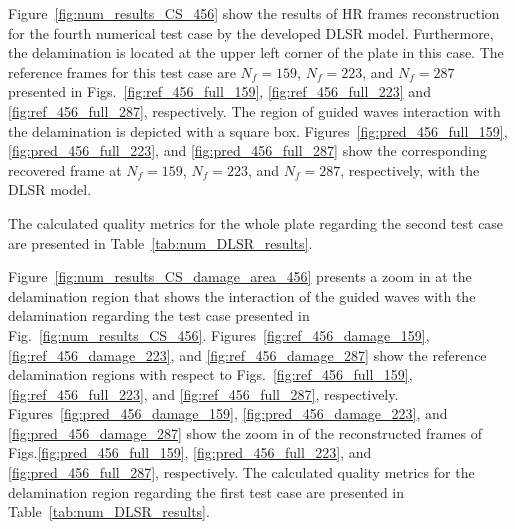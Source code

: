 Figure~\ref{fig:num_results_CS_456} show the results of HR frames reconstruction for the fourth numerical test case by the developed DLSR model.
Furthermore, the delamination is located at the upper left corner of the plate in this case.
The reference frames for this test case are $N_f=159$, $N_f=223$, and $N_f=287$ presented in Figs.~\ref{fig:ref_456_full_159}, \ref{fig:ref_456_full_223} and \ref{fig:ref_456_full_287}, respectively.
The region of guided waves interaction with the delamination is depicted with a square box.
Figures~\ref{fig:pred_456_full_159}, \ref{fig:pred_456_full_223}, and \ref{fig:pred_456_full_287} show the corresponding recovered frame at $N_f=159$, $N_f=223$, and $N_f=287$, respectively, with the DLSR model.

The calculated quality metrics for the whole plate regarding the second test case are presented in Table~\ref{tab:num_DLSR_results}.

Figure~\ref{fig:num_results_CS_damage_area_456} presents a zoom in at the delamination region that shows the interaction of the guided waves with the delamination regarding the test case presented in Fig.~\ref{fig:num_results_CS_456}.
Figures~\ref{fig:ref_456_damage_159}, \ref{fig:ref_456_damage_223}, and \ref{fig:ref_456_damage_287} show the reference delamination regions with respect to Figs.~\ref{fig:ref_456_full_159}, \ref{fig:ref_456_full_223}, and \ref{fig:ref_456_full_287}, respectively.
Figures~\ref{fig:pred_456_damage_159}, \ref{fig:pred_456_damage_223}, and \ref{fig:pred_456_damage_287} show the zoom in of the reconstructed frames of Figs.\ref{fig:pred_456_full_159}, \ref{fig:pred_456_full_223}, and \ref{fig:pred_456_full_287}, respectively.
The calculated quality metrics for the delamination region regarding the first test case are presented in Table~\ref{tab:num_DLSR_results}.

